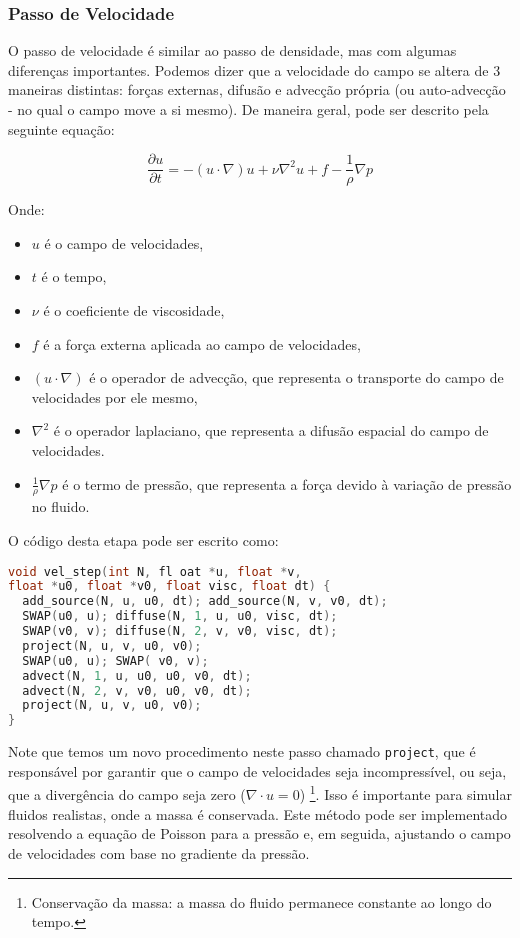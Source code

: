 \subsubsection*{Passo de Velocidade}
O passo de velocidade é similar ao passo de densidade, mas com algumas diferenças importantes. Podemos dizer que a velocidade do campo se altera de 3 maneiras distintas: forças externas, difusão e advecção própria (ou auto-advecção - no qual o campo move a si mesmo). De maneira geral, pode ser descrito pela seguinte equação:

$$\frac{\partial u}{\partial t} = - (u \cdot \nabla) u + \nu \nabla^2 u + f - \frac{1}{\rho} \nabla p$$

Onde:
\begin{itemize}
  \item $u$ é o campo de velocidades,
  \item $t$ é o tempo,
  \item $\nu$ é o coeficiente de viscosidade,
  \item $f$ é a força externa aplicada ao campo de velocidades,
  \item $(u \cdot \nabla)$ é o operador de advecção, que representa o transporte do campo de velocidades por ele mesmo,
  \item $\nabla^2$ é o operador laplaciano, que representa a difusão espacial do campo de velocidades.
  \item $\frac{1}{\rho} \nabla p$ é o termo de pressão, que representa a força devido à variação de pressão no fluido.
\end{itemize}

O código desta etapa pode ser escrito como:

\begin{lstlisting}[language=C]
void vel_step(int N, fl oat *u, float *v, 
float *u0, float *v0, float visc, float dt) {
  add_source(N, u, u0, dt); add_source(N, v, v0, dt);
  SWAP(u0, u); diffuse(N, 1, u, u0, visc, dt);
  SWAP(v0, v); diffuse(N, 2, v, v0, visc, dt);
  project(N, u, v, u0, v0);
  SWAP(u0, u); SWAP( v0, v);
  advect(N, 1, u, u0, u0, v0, dt);
  advect(N, 2, v, v0, u0, v0, dt);
  project(N, u, v, u0, v0);
}
\end{lstlisting}

Note que temos um novo procedimento neste passo chamado \texttt{project}, que é responsável por garantir que o campo de velocidades seja incompressível, ou seja, que a divergência do campo seja zero ($\nabla \cdot u = 0$) \footnote{Conservação da massa: a massa do fluido permanece constante ao longo do tempo.}. Isso é importante para simular fluidos realistas, onde a massa é conservada. Este método pode ser implementado resolvendo a equação de Poisson para a pressão e, em seguida, ajustando o campo de velocidades com base no gradiente da pressão.


